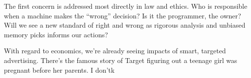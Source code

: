 \documentclass[11pt]{article}  %
\begin{document}
\begin{enumerate}
\begin{enumerate}
    The first concern is addressed most directly in law and ethics.  Who is
    responsible when a machine makes the ``wrong'' decision? Is it the
    programmer, the owner? Will we see a new standard of right and wrong as
    rigorous analysis and unbiased memory picks informs our actions? 
    \par
    With regard to economics, we're already seeing impacts of smart, targeted
    advertising.  There's the famous story of Target figuring out a teenage girl
    was pregnant before her parents.  I don'tk 
    \end{enumerate}
    \end{enumerate}
\end{document}
